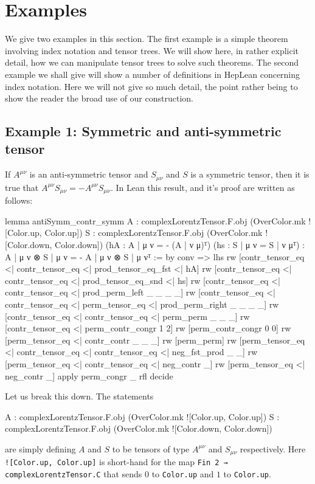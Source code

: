 \documentclass[a4paper, 11pt]{article}
\begin{document}
\section{Examples} \label{sec:examples}

We give two examples in this section. The first example is a simple theorem involving index notation and 
tensor trees. We will show here, in rather explicit detail, how we can manipulate tensor trees to solve 
such theorems. 
The second example we shall give will show a number of definitions in HepLean concerning index notation.
Here we will not give so much detail, the point rather being to show the reader the broad use of our 
construction. 

\subsection{Example 1: Symmetric and anti-symmetric tensor} \label{sec:exampleSymmAntiSymm}
If $A^{\mu \nu}$ is an anti-symmetric tensor and $S_{\mu \nu}$ and $S$ is a symmetric tensor, then
it is true that $A^{\mu \nu} S_{\mu \nu} = - A^{\mu \nu} S_{\mu \nu}$. In Lean this result, and 
it's proof are written as follows: 
\begin{code}
lemma antiSymm_contr_symm 
    {A : complexLorentzTensor.F.obj (OverColor.mk ![Color.up, Color.up])}
    {S : complexLorentzTensor.F.obj (OverColor.mk ![Color.down, Color.down])}
    (hA : {A | μ ν = - (A | ν μ)}ᵀ) (hs : {S | μ ν = S | ν μ}ᵀ) :
    {A | μ ν ⊗ S | μ ν = - A | μ ν ⊗ S | μ ν}ᵀ := by
  conv =>
    lhs
    rw [contr_tensor_eq <| contr_tensor_eq <| prod_tensor_eq_fst <| hA]
    rw [contr_tensor_eq <| contr_tensor_eq <| prod_tensor_eq_snd <| hs]
    rw [contr_tensor_eq <| contr_tensor_eq <| prod_perm_left _ _ _ _]
    rw [contr_tensor_eq <| contr_tensor_eq <| perm_tensor_eq <| prod_perm_right _ _ _ _]
    rw [contr_tensor_eq <| contr_tensor_eq <| perm_perm _ _ _]
    rw [contr_tensor_eq <| perm_contr_congr 1 2]
    rw [perm_contr_congr 0 0]
    rw [perm_tensor_eq <| contr_contr _ _ _]
    rw [perm_perm]
    rw [perm_tensor_eq <| contr_tensor_eq <| contr_tensor_eq <| neg_fst_prod _ _]
    rw [perm_tensor_eq <| contr_tensor_eq <| neg_contr _]
    rw [perm_tensor_eq <| neg_contr _]
  apply perm_congr _ rfl
  decide
\end{code}
Let us break this down. The statements 
\begin{code} 
{A : complexLorentzTensor.F.obj (OverColor.mk ![Color.up, Color.up])}
{S : complexLorentzTensor.F.obj (OverColor.mk ![Color.down, Color.down])}
\end{code}
are simply defining $A$ and $S$ to be tensors of type $A^{\mu \nu}$ and $S_{\mu \nu}$ respectively.
Here \lstinline|![Color.up, Color.up]| is short-hand for the map \lstinline|Fin 2 → complexLorentzTensor.C| that sends
$0$ to \lstinline|Color.up| and $1$ to \lstinline|Color.up|.
\end{document}
